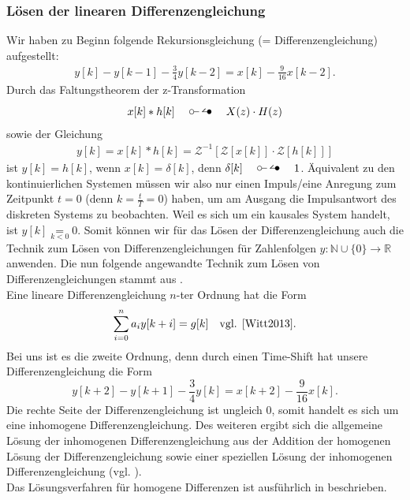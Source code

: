 \documentclass[11pt,a4paper,DIV=12]{scrartcl}
\begin{document}
\subsubsection{Lösen der linearen Differenzengleichung}
Wir haben zu Beginn folgende Rekursionsgleichung (= Differenzengleichung) aufgestellt:
%
\begin{gather}
	y[k]-y[k-1]-\frac{3}{4}y[k-2]=x[k]-\frac{9}{16}x[k-2].
\end{gather}
%
Durch das Faltungstheorem der z-Transformation
%
\begin{gather}
	x[k]\ast h[k]\quad\ztransf\quad X(z)\cdot H(z)
\end{gather}
%
sowie der Gleichung
%
\begin{gather}
	y[k]=x[k]\ast h[k]=\mathcal{Z}^{-1}\left[\mathcal{Z}\left[x[k]\right]\cdot\mathcal{Z}\left[h[k]\right]\right]
\end{gather}
%
ist $y[k]=h[k]$, wenn $x[k]=\delta[k]$, denn $\delta[k]\quad\ztransf\quad 1$.
%
Äquivalent zu den kontinuierlichen Systemen müssen wir also nur einen
Impuls/eine Anregung zum Zeitpunkt $t=0$ (denn $k=\frac{t}{T}=0$) haben,
um am Ausgang die Impulsantwort des diskreten Systems zu beobachten.
%
Weil es sich um ein kausales System handelt, ist $y[k]\underset{k<0}{=}0$.
%
Somit können wir für das Lösen der Differenzengleichung auch die Technik zum
Lösen von Differenzengleichungen für Zahlenfolgen
$y:\mathbb{N}\cup\{0\}\rightarrow\mathbb{R}$ anwenden.
%
Die nun folgende angewandte Technik zum Lösen von Differenzengleichungen stammt
aus \cite[Kap. 5]{Witt2013}.\\
%
Eine lineare Differenzengleichung $n$-ter Ordnung hat die Form
%
\begin{gather}
	\sum_{i=0}^na_iy[k+i]=g[k]\quad \text{vgl. \cite[Kap. 5 S. 80]{Witt2013}}.
\end{gather}
%
Bei uns ist es die zweite Ordnung, denn durch einen Time-Shift hat unsere
Differenzengleichung die Form
$$y[k+2]-y[k+1]-\frac{3}{4}y[k]=x[k+2]-\frac{9}{16}x[k].$$
%
Die rechte Seite der Differenzengleichung ist ungleich $0$,
somit handelt es sich um eine inhomogene Differenzengleichung.
%
Des weiteren ergibt sich die allgemeine Lösung der inhomogenen
Differenzengleichung aus der Addition der homogenen Lösung der
Differenzengleichung sowie einer speziellen Lösung der inhomogenen
Differenzengleichung (vgl. \cite[Kap. 5 S. 83]{Witt2013}).\\
%
Das Lösungsverfahren für homogene Differenzen ist ausführlich
in \cite[Kap. 5 S. 84-85]{Witt2013} beschrieben.\\
\end{document}
